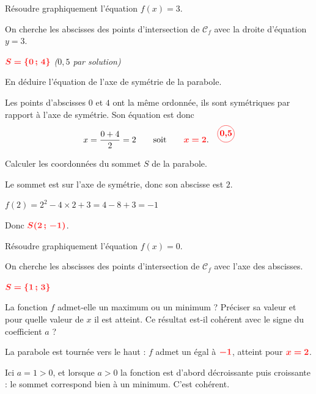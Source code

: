 \documentclass[11pt,a4paper]{article}  %
\begin{document}
	\begin{enumMet}
		\item Résoudre graphiquement l'équation $f(x)=3$.

		\begin{corrBox}
			On cherche les abscisses des points d'intersection de $\mathcal{C}_f$ avec la droite d'équation $y=3$.

			$\mRouge{S=\{0\,;\,4\}}$ \quad {} \quad \emph{($0{,}5$ par solution)}
		\end{corrBox}

		\item En déduire l'équation de l'axe de symétrie de la parabole.

		\begin{corrBox}
			Les points d'abscisses $0$ et $4$ ont la même ordonnée, ils sont symétriques par rapport à l'axe de symétrie. Son équation est donc
			\[x=\dfrac{0+4}{2}=2 \qquad \text{soit} \qquad \mRouge{x=2}. \quad \bareme{0,5}\]
		\end{corrBox}

		\item Calculer les coordonnées du sommet $S$ de la parabole.

		\begin{corrBox}
			Le sommet est sur l'axe de symétrie, donc son abscisse est $2$.

			$f(2)=2^2-4\times 2+3=4-8+3=-1$ \quad \bareme{0,5}

			Donc $\mRouge{S(2\,;\,-1)}$. \quad \bareme{0,5}
		\end{corrBox}

		\item Résoudre graphiquement l'équation $f(x)=0$.

		\begin{corrBox}
			On cherche les abscisses des points d'intersection de $\mathcal{C}_f$ avec l'axe des abscisses.

			$\mRouge{S=\{1\,;\,3\}}$ \quad {}

		\end{corrBox}

		\item {} La fonction $f$ admet-elle un maximum ou un minimum ? Préciser sa valeur et pour quelle valeur de $x$ il est atteint. Ce résultat est-il cohérent avec le signe du coefficient $a$ ?

		\begin{corrBox}
			La parabole est \og tournée vers le haut \fg{} : $f$ admet un  égal à $\mRouge{-1}$, atteint pour $\mRouge{x=2}$. \quad {}

			Ici $a=1>0$, et lorsque $a>0$ la fonction est d'abord décroissante puis croissante : le sommet correspond bien à un minimum. C'est cohérent. \quad \bareme{0,5}
		\end{corrBox}
	\end{enumMet}
\end{document}
